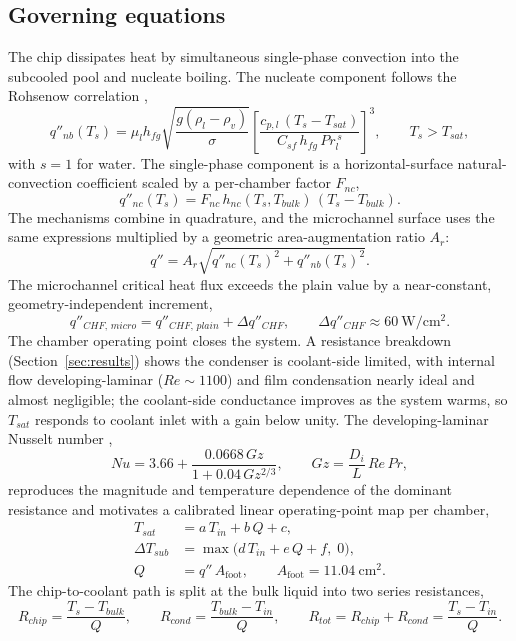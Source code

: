 \documentclass[11pt]{article}
\begin{document}
\subsection{Governing equations}
The chip dissipates heat by simultaneous single-phase convection into the subcooled pool
and nucleate boiling. The nucleate component follows the Rohsenow correlation
\cite{rohsenow1952},
\begin{equation}
q''_{nb}(T_s) = \mu_l h_{fg}\sqrt{\frac{g(\rho_l-\rho_v)}{\sigma}}
\left[\frac{c_{p,l}\,(T_s-T_{sat})}{C_{sf}\,h_{fg}\,Pr_l^{\,s}}\right]^{3},
\qquad T_s>T_{sat},
\label{eq:rohsenow}
\end{equation}
with $s=1$ for water. The single-phase component is a horizontal-surface natural-convection
coefficient scaled by a per-chamber factor $F_{nc}$,
\begin{equation}
q''_{nc}(T_s) = F_{nc}\, h_{nc}(T_s,T_{bulk})\,(T_s-T_{bulk}).
\label{eq:nc}
\end{equation}
The mechanisms combine in quadrature, and the microchannel surface uses the same
expressions multiplied by a geometric area-augmentation ratio $A_r$:
\begin{equation}
q'' = A_r\sqrt{q''_{nc}(T_s)^2 + q''_{nb}(T_s)^2}.
\label{eq:blend}
\end{equation}
The microchannel critical heat flux exceeds the plain value by a near-constant,
geometry-independent increment,
\begin{equation}
q''_{CHF,\,micro} = q''_{CHF,\,plain} + \Delta q''_{CHF},
\qquad \Delta q''_{CHF}\approx 60~\mathrm{W/cm^2}.
\label{eq:chf}
\end{equation}
The chamber operating point closes the system. A resistance breakdown
(Section~\ref{sec:results}) shows the condenser is coolant-side limited, with internal flow
developing-laminar ($Re\!\sim\!1100$) and film condensation nearly ideal and almost
negligible; the coolant-side conductance improves as the system warms, so $T_{sat}$
responds to coolant inlet with a gain below unity. The developing-laminar Nusselt number
\cite{hausen1943},
\begin{equation}
Nu = 3.66 + \frac{0.0668\,Gz}{1+0.04\,Gz^{2/3}},\qquad Gz=\frac{D_i}{L}\,Re\,Pr,
\label{eq:hausen}
\end{equation}
reproduces the magnitude and temperature dependence of the dominant resistance and motivates
a calibrated linear operating-point map per chamber,
\begin{align}
T_{sat} &= a\,T_{in} + b\,Q + c, \label{eq:tsat}\\
\Delta T_{sub} &= \max\!\big(d\,T_{in} + e\,Q + f,\;0\big),\label{eq:sub}\\
Q &= q''\,A_{\mathrm{foot}}, \qquad A_{\mathrm{foot}}=11.04~\mathrm{cm^2}.\nonumber
\end{align}
The chip-to-coolant path is split at the bulk liquid into two series resistances,
\begin{equation}
R_{chip}=\frac{T_s-T_{bulk}}{Q},\qquad R_{cond}=\frac{T_{bulk}-T_{in}}{Q},\qquad
R_{tot}=R_{chip}+R_{cond}=\frac{T_s-T_{in}}{Q}.
\label{eq:resistance}
\end{equation}
\end{document}
